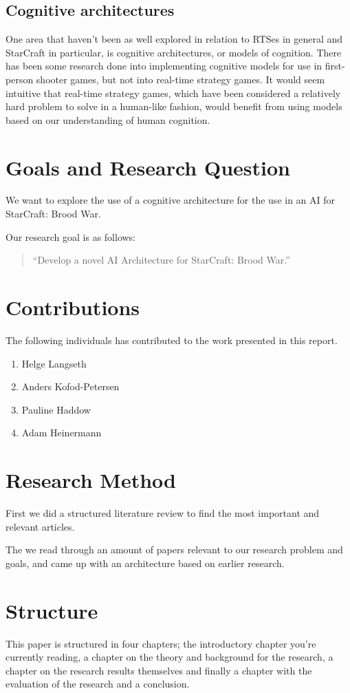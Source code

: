 \subsection{Cognitive architectures}
One area that haven't been as well explored in relation to RTSes in general and
StarCraft in particular, is cognitive architectures, or models of cognition.
There has been some research done into implementing cognitive models for use in
first-person shooter games, but not into real-time strategy games. It would seem
intuitive that real-time strategy games, which have been considered a relatively
hard problem to solve in a human-like fashion, would benefit from using models
based on our understanding of human cognition.

\section{Goals and Research Question}
We want to explore the use of a cognitive architecture for the use in an AI for
StarCraft: Brood War.

Our research goal is as follows:
\begin{quote}
 ``Develop a novel AI Architecture for StarCraft: Brood War.''
\end{quote}


\section{Contributions}
The following individuals has contributed to the work presented in this report.

\begin{enumerate}
 \item Helge Langseth
 \item Anders Kofod-Petersen
 \item Pauline Haddow
 \item Adam Heinermann
\end{enumerate}


\section{Research Method}
First we did a structured literature review to find the most important and
relevant articles.

The we read through an amount of papers relevant to our research problem and
goals, and came up with an architecture based on earlier research.


\section{Structure}
This paper is structured in four chapters; the introductory chapter you're
currently reading, a chapter on the theory and background for the research, a
chapter on the research results themselves and finally a chapter with the
evaluation of the research and a conclusion.